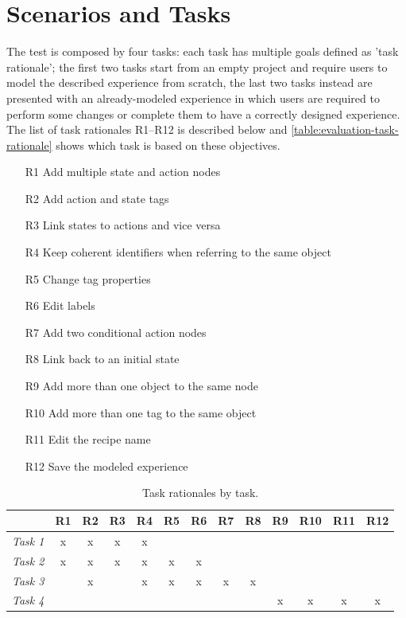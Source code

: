 \section{Scenarios and Tasks}
\label{sec:evaluation-scenarios}

The test is composed by four tasks: each task has multiple goals defined as 'task rationale'; the first two tasks start from an empty project and require users to model the described experience from scratch, the last two tasks instead are presented with an already-modeled experience in which users are required to perform some changes or complete them to have a correctly designed experience.
The list of task rationales R1--R12 is described below and \autoref{table:evaluation-task-rationale} shows which task is based on these objectives.
\begin{itemize}
    \item[R1]Add multiple state and action nodes
    \item[R2]Add action and state tags
    \item[R3]Link states to actions and vice versa
    \item[R4]Keep coherent identifiers when referring to the same object
    \item[R5]Change tag properties
    \item[R6]Edit labels
    \item[R7]Add two conditional action nodes
    \item[R8]Link back to an initial state
    \item[R9]Add more than one object to the same node
    \item[R10]Add more than one tag to the same object
    \item[R11]Edit the recipe name
    \item[R12]Save the modeled experience
\end{itemize}

\begin{table}[h!]
\centering
\begin{tabular}{|l|c|c|c|c|c|c|c|c|c|c|c|c|} 
\cline{2-13}
\multicolumn{1}{l|}{} & \multicolumn{1}{l|}{R1} & \multicolumn{1}{l|}{R2} & \multicolumn{1}{l|}{R3} & \multicolumn{1}{l|}{R4} & \multicolumn{1}{l|}{R5} & \multicolumn{1}{l|}{R6} & \multicolumn{1}{l|}{R7} & \multicolumn{1}{l|}{R8} & \multicolumn{1}{l|}{R9} & \multicolumn{1}{l|}{R10} & \multicolumn{1}{l|}{R11} & \multicolumn{1}{l|}{R12}  \\ 
\hline
\textit{Task 1}       & x & x & x & x &   &   &   &   &   &    &    &     \\ 
\hline
\textit{Task 2}       & x & x & x & x & x & x &   &   &   &    &    &     \\ 
\hline
\textit{Task 3}       &   & x &   & x & x & x & x & x &   &    &    &     \\ 
\hline
\textit{Task 4}       &   &   &   &   &   &   &   &   & x & x  & x  & x   \\
\hline
\end{tabular}
\caption{Task rationales by task.}
\label{table:evaluation-task-rationale}
\end{table}


